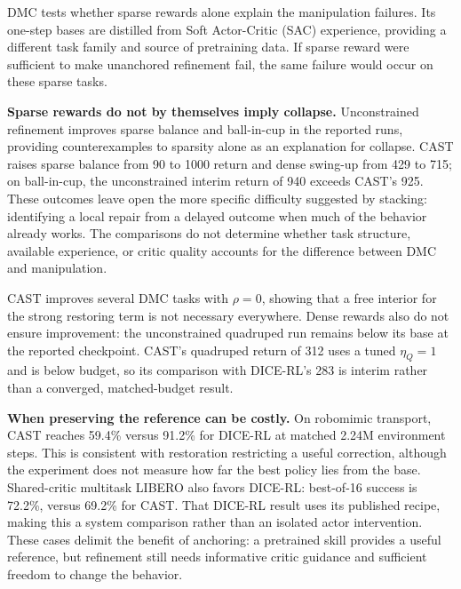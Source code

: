 DMC tests whether sparse rewards alone explain the manipulation failures.
Its one-step bases are distilled from Soft Actor-Critic (SAC) experience,
providing a different task family and source of pretraining data. If sparse
reward were sufficient to make unanchored refinement fail, the same failure
would occur on these sparse tasks.

\textbf{Sparse rewards do not by themselves imply collapse.}
Unconstrained refinement improves sparse balance and ball-in-cup in the
reported runs, providing counterexamples to sparsity alone as an
explanation for collapse. CAST raises sparse balance from 90 to 1000
return and dense swing-up from 429 to 715; on ball-in-cup, the unconstrained
interim return of 940 exceeds CAST's 925. These outcomes leave open the
more specific difficulty suggested by stacking: identifying a local repair
from a delayed outcome when much of the behavior already works. The
comparisons do not determine whether task structure, available experience,
or critic quality accounts for the difference between DMC and manipulation.

CAST improves several DMC tasks with $\rho=0$, showing that a free interior
for the strong restoring term is not necessary everywhere. Dense rewards
also do not ensure improvement: the unconstrained quadruped run remains
below its base at the reported checkpoint. CAST's quadruped return of 312
uses a tuned $\eta_Q=1$ and is below budget, so its comparison with
DICE-RL's 283 is interim rather than a converged, matched-budget result.

\textbf{When preserving the reference can be costly.}
On robomimic transport, CAST reaches 59.4\% versus 91.2\% for DICE-RL
at matched 2.24M environment steps. This is consistent with restoration
restricting a useful correction, although the experiment does not measure
how far the best policy lies from the base. Shared-critic multitask LIBERO
also favors DICE-RL: best-of-16 success is 72.2\%, versus 69.2\% for
CAST. That DICE-RL result uses its published recipe, making this a system
comparison rather than an isolated actor intervention. These cases delimit
the benefit of anchoring: a pretrained skill provides a useful reference,
but refinement still needs informative critic guidance and sufficient
freedom to change the behavior.
